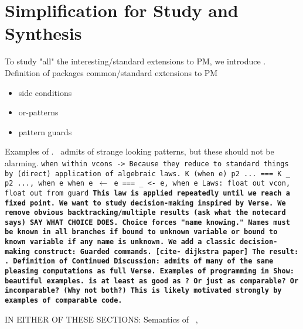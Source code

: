 \documentclass[manuscript,screen,review, 12pt]{acmart}
\begin{document}
\section{Simplification for Study and Synthesis}
\begin{outline}[enumerate]
    \1 To study "all" the interesting/standard extensions to PM, we introduce
    \PPlus.
    \2 Definition of \PPlus
    \2 {\PPlus} packages common/standard extensions to PM
    \begin{itemize}
        \item side conditions
        \item or-patterns 
        \item pattern guards 
    \end{itemize}
        \3 Examples of \PPlus. 
    \2 \PPlus\ admits of strange looking patterns, but these should not be alarming. 
    \3 \tt{when} within vcons 
    \2 -> Because they reduce to standard things by (direct) application of algebraic laws. 
        \3 K (when e) p2 ... === K \_ p2 ..., when e
        \3 when e $\leftarrow$ e === \_ <- e, when e
        \3 Laws: float out vcon, float out from guard
        \3 \bf{This law is applied repeatedly until we reach a fixed point.}
    \1 We want to study decision-making inspired by Verse. 
        \2 We remove obvious backtracking/multiple results (ask what the notecard says)
        SAY WHAT CHOICE DOES. 
        \bf{Choice forces "name knowing." Names must be known in all branches 
        if bound to unknown variable or bound to known variable if any name 
        is unknown}.
        \2 We add a classic decision-making construct: Guarded commands. 
        [cite- dijkstra paper]
        \2 The result: \VMinus. 
    \1 Definition of \VMinus
    \1 Continued Discussion:
    \2 {\VMinus} admits of many of the same pleasing computations as full Verse. 
    \2 Examples of programming in \VMinus 
    \3 Show: beautiful examples. 
    \2 {\VMinus} is at least as good as {\PPlus}? Or just as comparable? 
        Or incomparable? (Why not both?)
    \3 \bf{This is likely motivated strongly by examples of comparable code.}
    \end{outline}

IN EITHER OF THESE SECTIONS: Semantics of \PPlus\ , \VMinus
\end{document}
